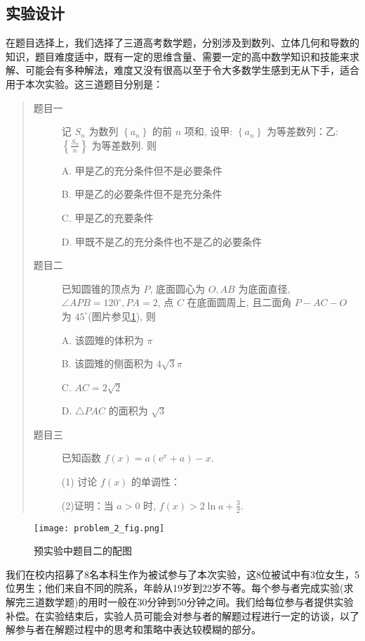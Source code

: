 \subsection{实验设计}
在题目选择上，我们选择了三道高考数学题，分别涉及到数列、立体几何和导数的知识，题目难度适中，既有一定的思维含量、需要一定的高中数学知识和技能来求解、可能会有多种解法，难度又没有很高以至于令大多数学生感到无从下手，适合用于本次实验。这三道题目分别是：

\begin{quote}
    \begin{description}
        \item[题目一] 记 $S_n$ 为数列 $\left\{a_n\right\}$ 的前 $n$ 项和, 设甲: $\left\{a_n\right\}$ 为等差数列：乙: $\left\{\frac{S_n}{n}\right\}$ 为等差数列. 则

        A. 甲是乙的充分条件但不是必要条件

        B. 甲是乙的必要条件但不是充分条件

        C. 甲是乙的充要条件

        D. 甲既不是乙的充分条件也不是乙的必要条件

        \item[题目二] 已知圆锥的顶点为 $P$, 底面圆心为 $O, A B$ 为底面直径, $\angle A P B=120^{\circ}, P A=2$, 点 $C$ 在底面圆周上, 且二面角 $P-A C-O$ 为 $45^{\circ}$(图片参见\ref{fig:problem_2_fig}), 则

        A. 该圆雉的体积为 $\pi$

        B. 该圆雉的侧面积为 $4 \sqrt{3} \pi$

        C. $A C=2 \sqrt{2}$

        D. $\triangle P A C$ 的面积为 $\sqrt{3}$

        \item[题目三] 已知函数 $f(x)=a\left(\mathrm{e}^x+a\right)-x$.

        (1) 讨论 $f(x)$ 的单调性：

        (2)证明：当 $a>0$ 时, $f(x)>2 \ln a+\frac{3}{2}$.
    \end{description}
\end{quote}

\begin{figure}
    \centering
    \texttt{[image: problem\_2\_fig.png]}
    \caption{预实验中题目二的配图}
    \label{fig:problem_2_fig}
\end{figure}

我们在校内招募了8名本科生作为被试参与了本次实验，这8位被试中有3位女生，5位男生；他们来自不同的院系，年龄从19岁到22岁不等。每个参与者完成实验(求解完三道数学题)的用时一般在30分钟到50分钟之间。我们给每位参与者提供实验补偿。在实验结束后，实验人员可能会对参与者的解题过程进行一定的访谈，以了解参与者在解题过程中的思考和策略中表达较模糊的部分。

